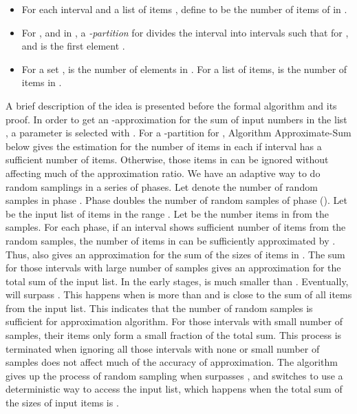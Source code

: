 \documentclass[runningheads]{llncs}
\newcommand{\scrod}{\quad\nopagebreak}
\begin{document}
\begin{definition}\label{partition-def}\scrod
\begin{itemize}
\item
For each interval  and a list of items , define  to be
the number of items of  in .

\item
For , and  in , a {\it
-partition} for  divides the interval
 into intervals 
 such that  for , and 
is the first element .

\item
For a set ,  is the number of elements in . For a list
 of items,  is the number of items in .
\end{itemize}
\end{definition}



A brief description of the idea is presented before the formal
algorithm and its proof. In order to get an
-approximation for the sum of  input numbers in the
list , a parameter  is selected with . For a -partition  for , Algorithm Approximate-Sum
below gives the estimation for the number of items in each  if
interval  has a sufficient number of items. Otherwise, those
items in  can be ignored without affecting much of the
approximation ratio. We have an adaptive way to do random samplings
in a series of phases. Let  denote the number of random samples
in phase . Phase  doubles the number of random samples of
phase  (). Let  be the input list of items in
the range . Let  be the number items in  from the
samples. For each phase, if an interval  shows sufficient
number of items from the random samples, the number of items
 in  can be sufficiently approximated by
. Thus, 
also gives an approximation for the sum of the sizes of items in
. The sum  for those
intervals  with large number of samples gives an approximation
for the total sum  of the input list.  In the early
stages,  is much smaller than . Eventually,
 will surpass . This happens when  is
more than  and  is close to the
sum  of all items from the input list. This
indicates that the number of random samples is sufficient for
approximation algorithm. For those intervals with small number of
samples, their items only form a small fraction of the total sum.
This process is terminated when ignoring all those intervals with
none or small number of samples does not affect much of the accuracy
of approximation. The algorithm gives up the process of random
sampling when  surpasses , and switches to use a
deterministic way to access the input list, which happens when the
total sum of the sizes of input items is .
\end{document}
